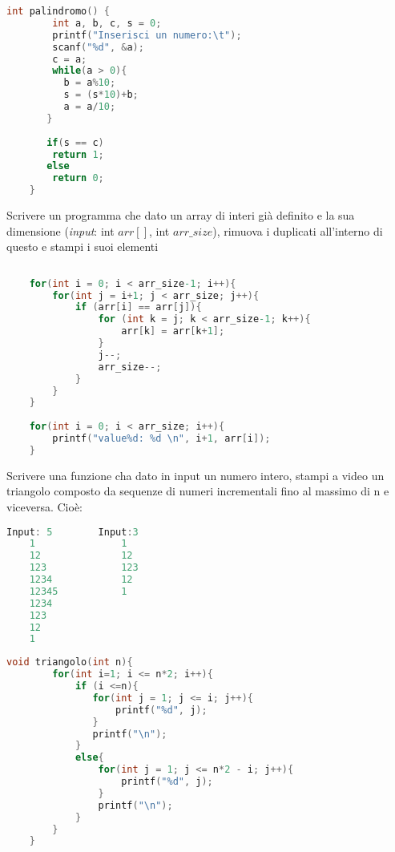 \documentclass[addpoints,11pt]{exam}
\begin{document}
\begin{questions}
\begin{minipage}[t]{0.5\linewidth}
	\begin{lstlisting}[language=C]
	int palindromo() {
		int a, b, c, s = 0;
		printf("Inserisci un numero:\t");
		scanf("%d", &a);
		c = a;
		while(a > 0){
		  b = a%10;
		  s = (s*10)+b;
		  a = a/10;
	   }
	   
	   if(s == c)
		return 1;
	   else 
		return 0;
	}
	\end{lstlisting}
\end{minipage}



\question[3]
Scrivere un programma che dato un array di interi già definito e la sua dimensione (\emph{input}: int $arr[]$, int $arr\_size$), rimuova i duplicati all'interno di questo e stampi i suoi elementi


\begin{minipage}[t]{\linewidth}
	\begin{lstlisting}[language=C]
	
	for(int i = 0; i < arr_size-1; i++){
        for(int j = i+1; j < arr_size; j++){
            if (arr[i] == arr[j]){
                for (int k = j; k < arr_size-1; k++){
                    arr[k] = arr[k+1];
                }
                j--;
                arr_size--;
            }
        }
    }
    
    for(int i = 0; i < arr_size; i++){
        printf("value%d: %d \n", i+1, arr[i]);
    }
    \end{lstlisting}   
\end{minipage}



\question[2]
Scrivere una funzione cha dato in input un numero intero, stampi a video un triangolo composto da sequenze di numeri incrementali fino al massimo di n e viceversa. Cioè: \\
\begin{minipage}[t]{0.5\linewidth}
	\begin{lstlisting}[language=C]
	Input: 5        Input:3
	1               1
	12              12
	123             123
	1234            12
	12345           1
	1234
	123
	12
	1\end{lstlisting}
\end{minipage}

\begin{minipage}[t]{0.5\linewidth}
	\begin{lstlisting}[language=C]
	void triangolo(int n){
		for(int i=1; i <= n*2; i++){
			if (i <=n){
			   for(int j = 1; j <= i; j++){
				   printf("%d", j);
			   } 
			   printf("\n");
			}
			else{
				for(int j = 1; j <= n*2 - i; j++){
					printf("%d", j);
				}
				printf("\n");
			}
		}
	}
	\end{lstlisting}
\end{minipage}




\end{questions}
\end{document}
